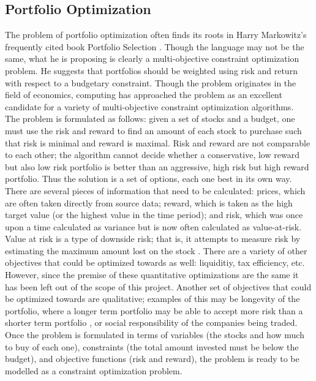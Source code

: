 \documentclass{article}
\begin{document}
    \subsection{Portfolio Optimization}
    The problem of portfolio optimization often finds its roots in Harry Markowitz's frequently cited book Portfolio Selection \cite{Markowitz}. Though
    the language may not be the same, what he is proposing is clearly a multi-objective constraint optimization problem. He suggests that portfolios
    should be weighted using risk and return with respect to a budgetary constraint. Though the problem originates in the field of 
    economics, computing has approached the problem as an excellent candidate for a variety of multi-objective constraint optimization algorithms. \\
    The problem is formulated as follows: given a set of stocks and a budget, one must use the risk and reward to find an amount of each stock to
    purchase such that risk is minimal and reward is maximal. Risk and reward are not comparable to each other; the algorithm cannot decide whether
    a conservative, low reward but also low risk portfolio is better than an aggressive, high risk but high reward portfolio. Thus the solution is a 
    set of options, each one best in its own way. There are several pieces of information that need to be calculated: prices, which are often taken 
    directly from source data; reward, which is taken as the high target value (or the highest value in the time period); and risk, which was once 
    upon a time calculated as variance
    but is now often calculated as value-at-risk. Value at risk is a type of downside risk; that is, it attempts to measure risk by estimating the
    maximum amount lost on the stock \cite{HongHuZhang} \cite{Cid}. There are a variety of other objectives that could be optimized towards as well: 
    liquiditiy, tax efficiency, etc. However, since the premise of these quantitative optimizations are the same it has been left out of the scope 
    of this project. Another set of objectives that could be optimized towards are qualitative; examples of this may be longevity of the portfolio,
    where a longer term portfolio may be able to accept more risk than a shorter term portfolio \cite{Xiongetal}, or social responsibility of the 
    companies being traded. Once the problem is formulated in terms of variables (the stocks and how much to buy of each one), constraints (the 
    total amount invested must be below the budget), and objective functions (risk and reward), the problem is ready to be modelled as a constraint
    optimization problem.
\end{document}
